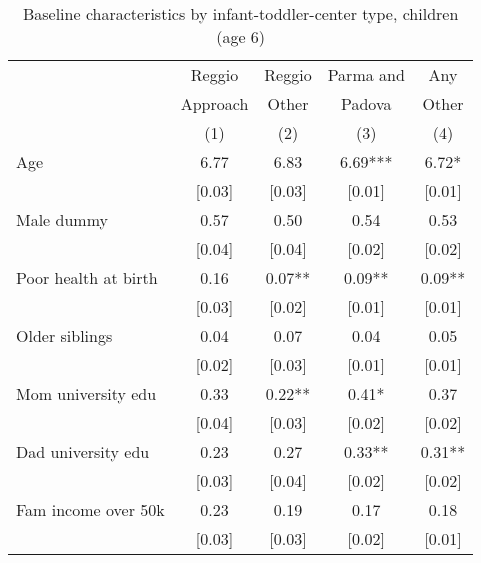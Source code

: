 \begin{table}[H]
\caption{Baseline characteristics by infant-toddler-center type, children (age 6)}
\label{tab:child_CONTROLasilo}
\centering
\begin{adjustbox}{max height=\dimexpr\textheight-5.5cm\relax,max width=\textwidth}
\small
\begin{tabular}{l cccc}
\hline \hline 
 & Reggio & Reggio & Parma and & Any \\
 & Approach & Other & Padova & Other \\
 &   (1)    &  (2)  & (3)    &  (4) \\
\hline 

Age & 6.77 & 6.83 & 6.69*** & 6.72* \\
 & [0.03] & [0.03] & [0.01] & [0.01] \\
Male dummy & 0.57 & 0.50 & 0.54 & 0.53 \\
 & [0.04] & [0.04] & [0.02] & [0.02] \\
Poor health at birth & 0.16 & 0.07** & 0.09** & 0.09** \\
 & [0.03] & [0.02] & [0.01] & [0.01] \\
Older siblings  & 0.04 & 0.07 & 0.04 & 0.05 \\
 & [0.02] & [0.03] & [0.01] & [0.01] \\
Mom university edu  & 0.33 & 0.22** & 0.41* & 0.37 \\
 & [0.04] & [0.03] & [0.02] & [0.02] \\
Dad university edu  & 0.23 & 0.27 & 0.33** & 0.31** \\
 & [0.03] & [0.04] & [0.02] & [0.02] \\
Fam income over 50k  & 0.23 & 0.19 & 0.17 & 0.18 \\
 & [0.03] & [0.03] & [0.02] & [0.01] \\

\end{tabular}
\end{adjustbox}
\end{table}
